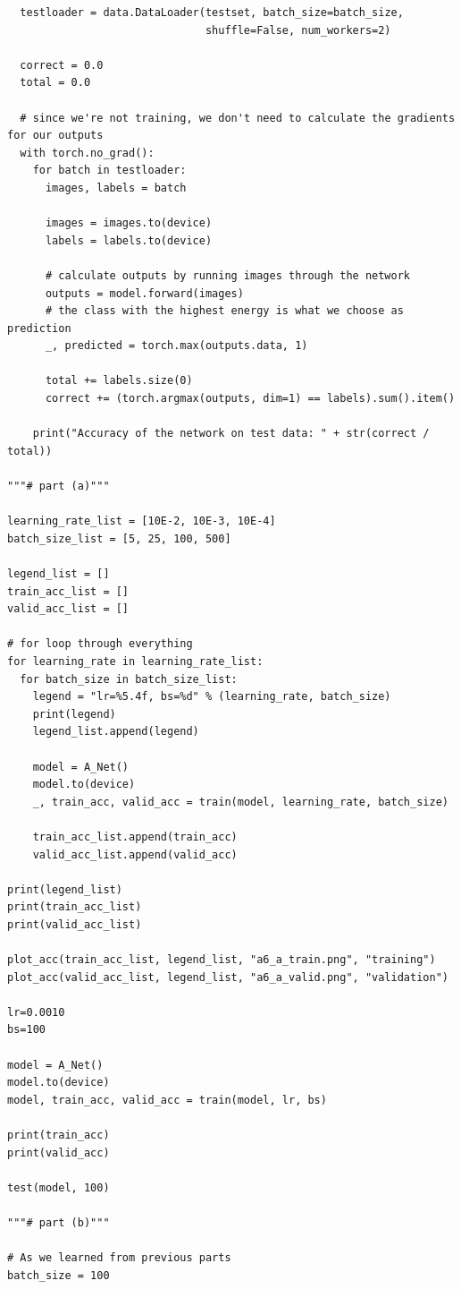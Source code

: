 \documentclass{article}
\newcommand{\1}{\mathbf{1}}
\begin{document}
{\begin{verbatim}
  testloader = data.DataLoader(testset, batch_size=batch_size,
                               shuffle=False, num_workers=2)

  correct = 0.0
  total = 0.0

  # since we're not training, we don't need to calculate the gradients for our outputs
  with torch.no_grad():
    for batch in testloader:
      images, labels = batch

      images = images.to(device)
      labels = labels.to(device)

      # calculate outputs by running images through the network 
      outputs = model.forward(images)
      # the class with the highest energy is what we choose as prediction
      _, predicted = torch.max(outputs.data, 1)

      total += labels.size(0)
      correct += (torch.argmax(outputs, dim=1) == labels).sum().item()

    print("Accuracy of the network on test data: " + str(correct / total))

"""# part (a)"""

learning_rate_list = [10E-2, 10E-3, 10E-4]
batch_size_list = [5, 25, 100, 500]

legend_list = []
train_acc_list = []
valid_acc_list = []

# for loop through everything 
for learning_rate in learning_rate_list:
  for batch_size in batch_size_list:
    legend = "lr=%5.4f, bs=%d" % (learning_rate, batch_size)
    print(legend)
    legend_list.append(legend)

    model = A_Net()
    model.to(device)
    _, train_acc, valid_acc = train(model, learning_rate, batch_size)

    train_acc_list.append(train_acc)
    valid_acc_list.append(valid_acc)

print(legend_list)
print(train_acc_list)
print(valid_acc_list)

plot_acc(train_acc_list, legend_list, "a6_a_train.png", "training")
plot_acc(valid_acc_list, legend_list, "a6_a_valid.png", "validation")

lr=0.0010
bs=100

model = A_Net()
model.to(device)
model, train_acc, valid_acc = train(model, lr, bs)

print(train_acc)
print(valid_acc)

test(model, 100)

"""# part (b)"""

# As we learned from previous parts
batch_size = 100


\end{verbatim}}
\end{document}
